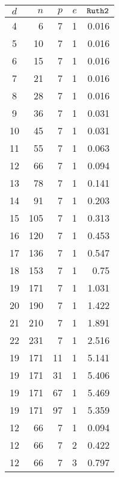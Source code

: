 \documentclass[12pt]{report}
\begin{document}
\begin{table}[htp]
\label{ruth}
\begin{center}
\begin{tabular}
{|c|r|r|r|r|} \hline
$d$ & $n$ & $p$ & $e$ & ${\tt Ruth2}$ \rule{0cm}{2.5ex}\\ \hline
4	&	6	&	7	&	1	&	0.016	\rule{0cm}{2.5ex}\\ \hline
5	&	10	&	7	&	1	&	0.016	\rule{0cm}{2.5ex}\\ \hline
6	&	15	&	7	&	1	&	0.016	\rule{0cm}{2.5ex}\\ \hline
7	&	21	&	7	&	1	&	0.016	\rule{0cm}{2.5ex}\\ \hline
8	&	28	&	7	&	1	&	0.016	\rule{0cm}{2.5ex}\\ \hline
9	&	36	&	7	&	1	&	0.031	\rule{0cm}{2.5ex}\\ \hline
10	&	45	&	7	&	1	&	0.031	\rule{0cm}{2.5ex}\\ \hline
11	&	55	&	7	&	1	&	0.063	\rule{0cm}{2.5ex}\\ \hline
12	&	66	&	7	&	1	&	0.094	\rule{0cm}{2.5ex}\\ \hline
13	&	78	&	7	&	1	&	0.141	\rule{0cm}{2.5ex}\\ \hline
14	&	91	&	7	&	1	&	0.203	\rule{0cm}{2.5ex}\\ \hline
15	&	105	&	7	&	1	&	0.313	\rule{0cm}{2.5ex}\\ \hline
16	&	120	&	7	&	1	&	0.453	\rule{0cm}{2.5ex}\\ \hline
17	&	136	&	7	&	1	&	0.547	\rule{0cm}{2.5ex}\\ \hline
18	&	153	&	7	&	1	&	0.75	\rule{0cm}{2.5ex}\\ \hline
19	&	171	&	7	&	1	&	1.031	\rule{0cm}{2.5ex}\\ \hline
20	&	190	&	7	&	1	&	1.422	\rule{0cm}{2.5ex}\\ \hline
21	&	210	&	7	&	1	&	1.891	\rule{0cm}{2.5ex}\\ \hline
22	&	231	&	7	&	1	&	2.516	\rule{0cm}{2.5ex}\\ \hline
19	&	171	&	11	&	1	&	5.141	\rule{0cm}{2.5ex}\\ \hline
19	&	171	&	31	&	1	&	5.406	\rule{0cm}{2.5ex}\\ \hline
19	&	171	&	67	&	1	&	5.469	\rule{0cm}{2.5ex}\\ \hline
19	&	171	&	97	&	1	&	5.359	\rule{0cm}{2.5ex}\\ \hline
12	&	66	&	7	&	1	&	0.094	\rule{0cm}{2.5ex}\\ \hline
12	&	66	&	7	&	2	&	0.422	\rule{0cm}{2.5ex}\\ \hline
12	&	66	&	7	&	3	&	0.797	\rule{0cm}{2.5ex}\\ \hline

\end{tabular}
\end{center}
\end{table}
\end{document}
